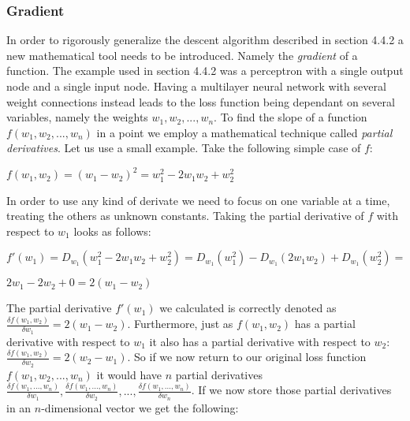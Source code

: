 \documentclass[titlepage]{article}
\begin{document}
\newpage

\subsubsection{Gradient}

\vskip 0.2cm

In order to rigorously generalize the descent algorithm described in section 4.4.2 a new mathematical tool needs to be introduced. Namely the \emph{gradient} of a function. The example used in section 4.4.2 was a perceptron with a single output node and a single input node. Having a multilayer neural network with several weight connections instead leads to the loss function being dependant on several variables, namely the weights $w_{1}, w_{2}, ..., w_{n}$. To find the slope of a function $f(w_{1}, w_{2}, ..., w_{n})$ in a point we employ a mathematical technique called \emph{partial derivatives}. Let us use a small example. Take the following simple case of $f$: 

\vskip 0.5cm

\centerline{$f(w_{1}, w_{2}) = (w_{1} - w_{2})^2 = w_{1}^2 - 2w_{1}w_{2} + w_{2}^2$}

\vskip 0.5cm

\noindent
In order to use any kind of derivate we need to focus on one variable at a time, treating the others as unknown constants. Taking the partial derivative of $f$ with respect to $w_{1}$ looks as follows:

\vskip 0.3cm

\centerline{$f'(w_{1}) = D_{w_{1}}(w_{1}^2 - 2w_{1}w_{2} + w_{2}^2) = D_{w_{1}}(w_{1}^2) - D_{w_{1}}(2w_{1}w_{2}) + D_{w_{1}}(w_{2}^2) =$}

\vskip 0.3cm

\centerline{$2w_{1} - 2w_{2} + 0 = 2(w_{1} - w_{2})$}

\vskip 0.3cm

\noindent
The partial derivative $f'(w_{1})$ we calculated is correctly denoted as $\frac{\delta f(w_{1}, w_{2})}{\delta w_{1}} = 2(w_{1} - w_{2})$. Furthermore, just as $f(w_{1}, w_{2})$ has a partial derivative with respect to $w_{1}$ it also has a partial derivative with respect to $w_{2}$: $\frac{\delta f(w_{1}, w_{2})}{\delta w_{2}} = 2(w_{2} - w_{1})$. So if we now return to our original loss function $f(w_{1}, w_{2}, ..., w_{n})$ it would have $n$ partial derivatives $\frac{\delta f(w_{1}, ..., w_{n})}{\delta w_{1}}, \frac{\delta f(w_{1}, ..., w_{n})}{\delta w_{2}}, ..., \frac{\delta f(w_{1}, ..., w_{n})}{\delta w_{n}}$. If we now store those partial derivatives in an $n$-dimensional vector we get the following:
\end{document}
